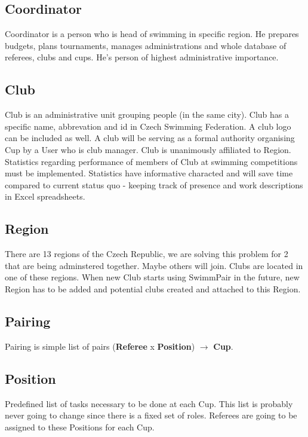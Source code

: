 \subsection*{Coordinator}
Coordinator is a person who is head of swimming in specific region. He prepares budgets, plans tournaments, manages administrations and whole database of referees, clubs and cups. He's person of highest administrative importance.
\subsection*{Club}
\par
Club is an administrative unit grouping people (in the same city). Club has a specific name, abbrevation and id in Czech Swimming Federation. A club logo can be included as well. A club will be serving as a formal authority organising Cup by a User who is club manager. Club is unanimously affiliated to Region. Statistics regarding performance of members of Club at swimming competitions must be implemented. Statistics have informative characted and will save time compared to current status quo - keeping track of presence and work descriptions in Excel spreadsheets.
\subsection*{Region}
There are 13 regions of the Czech Republic, we are solving this problem for 2 that are being adminstered together. Maybe others will join. Clubs are located in one of these regions. When new Club starts using SwimmPair in the future, new Region has to be added and potential clubs created and attached to this Region. 

\subsection*{Pairing}
Pairing is simple list of pairs (\textbf{Referee} x \textbf{Position}) $\rightarrow$ \textbf{Cup}.
\subsection*{Position}
Predefined list of tasks necessary to be done at each Cup. This list is probably never going to change since there is a fixed set of roles. Referees are going to be assigned to these Positions for each Cup.
\newpage
